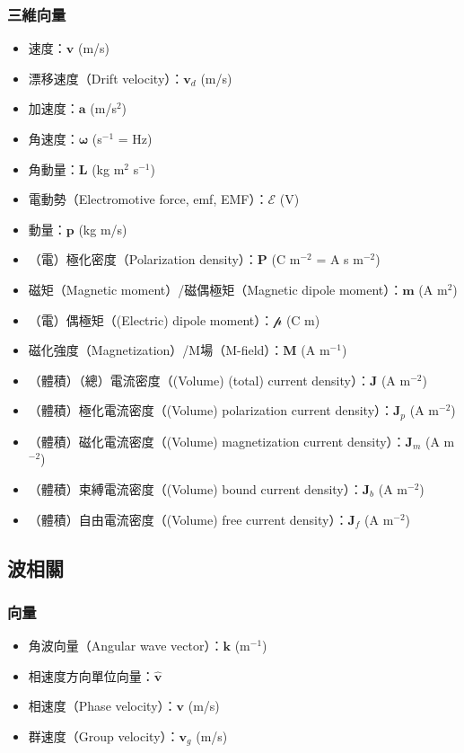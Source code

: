 \documentclass[a4paper,12pt]{report}
\begin{document}
\begin{itemize}
\subsubsection{三維向量}
\begin{itemize}
\item 速度：$\mathbf{v}$ (m/s)
\item 漂移速度（Drift velocity）：$\mathbf{v}_d$ (m/s)
\item 加速度：$\mathbf{a}$ (m/s$^2$)
\item 角速度：$\boldsymbol{\omega}$ (s$^{-1}$ = Hz)
\item 角動量：$\mathbf{L}$ (kg m$^2$ s$^{-1}$)
\item 電動勢（Electromotive force, emf, EMF）：$\mathcal{E}$ (V)
\item 動量：$\mathbf{p}$ (kg m/s)
\item （電）極化密度（Polarization density）：$\mathbf{P}$ (C m$^{-2}$ = A s m$^{-2}$)
\item 磁矩（Magnetic moment）/磁偶極矩（Magnetic dipole moment）：$\mathbf{m}$ (A m$^2$)
\item （電）偶極矩（(Electric) dipole moment）：$\mathscr{p}$ (C m)
\item 磁化強度（Magnetization）/M場（M-field）：$\mathbf{M}$ (A m$^{-1}$)
\item （體積）（總）電流密度（(Volume) (total) current density）：$\mathbf{J}$ (A m$^{-2}$)
\item （體積）極化電流密度（(Volume) polarization current density）：$\mathbf{J}_p$ (A m$^{-2}$)
\item （體積）磁化電流密度（(Volume) magnetization current density）：$\mathbf{J}_m$ (A m$^{-2}$)
\item （體積）束縛電流密度（(Volume) bound current density）：$\mathbf{J}_b$ (A m$^{-2}$)
\item （體積）自由電流密度（(Volume) free current density）：$\mathbf{J}_f$ (A m$^{-2}$)
\end{itemize}
\subsection{波相關}
\subsubsection{向量}
\begin{itemize}
\item 角波向量（Angular wave vector）：$\mathbf{k}$ (m$^{-1}$)
\item 相速度方向單位向量：$\hat{\mathbf{v}}$
\item 相速度（Phase velocity）：$\mathbf{v}$ (m/s)
\item 群速度（Group velocity）：$\mathbf{v}_g$ (m/s)
\end{itemize}

\end{itemize}
\end{document}
